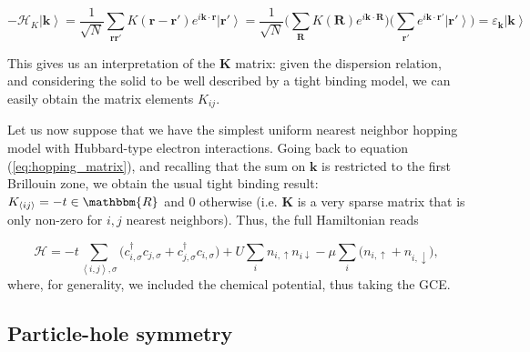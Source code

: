 \begin{equation}
- \mathcal{H}_{K} \left| \bm k \right\rangle = \frac{1}{\sqrt{N}} \sum_{\bm r \bm r'} K ( \bm r - \bm r' ) e^{i \bm k \cdot \bm r} \left| \bm r' \right \rangle = \frac{1}{\sqrt{N}} \bigg( \sum_{\bm R} K(\bm R) e^{i\bm k \cdot \bm R} \bigg)\bigg( \sum_{\bm r'} e^{i\bm k \cdot \bm r'} \left| \bm r' \right\rangle \bigg) = \varepsilon_{\bm k} \left| \bm k \right\rangle
\end{equation}

This gives us an interpretation of the $\bm K$ matrix: given the dispersion relation, and considering the solid to be well described by a tight binding model, we can easily obtain the matrix elements $K_{i j}$.

Let us now suppose that we have the simplest uniform nearest neighbor hopping model with Hubbard-type electron interactions.
Going back to equation (\ref{eq:hopping_matrix}), and recalling that the sum on $\bm k$ is restricted to the first Brillouin zone, we obtain the usual tight binding result: $K_{\left\langle i j \right\rangle} = - t \in \mathbbm{R}$ and $0$ otherwise (i.e. $\bm K$ is a very sparse matrix that is only non-zero for $i, j$ nearest neighbors).
Thus, the full Hamiltonian reads

\begin{equation}\label{eq:hubbard_hamiltonian}
\mathcal{H} = - t \sum_{\left\langle i, j \right\rangle, \sigma} \bigg(c_{i,\sigma}^\dagger c_{j,\sigma} + c_{j,\sigma}^\dagger c_{i,\sigma} \bigg) + U \sum_{i} n_{i,\uparrow} n_{i\downarrow} -\mu \sum_i \bigg( n_{i,\uparrow} + n_{i,\downarrow} \bigg) ,
\end{equation}
where, for generality, we included the chemical potential, thus taking the \acl{GCE}.

\subsection{Particle-hole symmetry}

